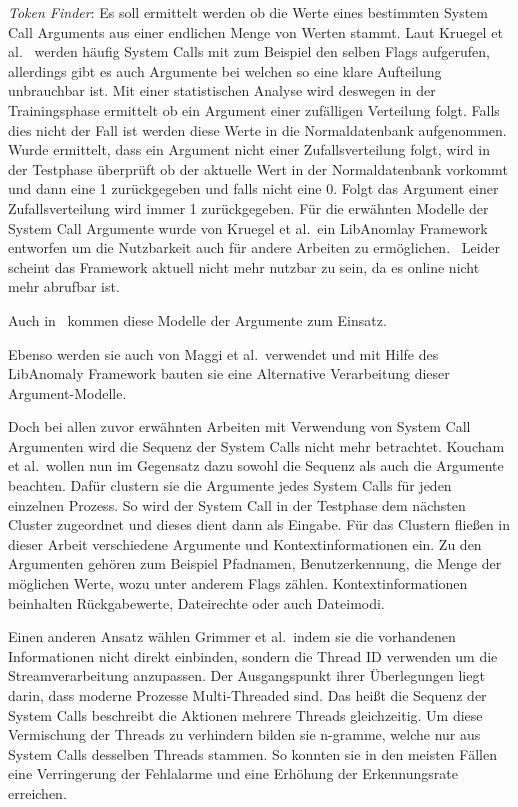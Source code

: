         \textit{Token Finder}: Es soll ermittelt werden ob die Werte eines bestimmten System Call Arguments aus einer endlichen Menge von Werten stammt.
        Laut Kruegel et al.~\cite{ARGUMENTS} werden häufig System Calls mit zum Beispiel den selben Flags aufgerufen, allerdings gibt es auch Argumente bei welchen so eine klare Aufteilung unbrauchbar ist.
        Mit einer statistischen Analyse wird deswegen in der Trainingsphase ermittelt ob ein Argument einer zufälligen Verteilung folgt.
        Falls dies nicht der Fall ist werden diese Werte in die Normaldatenbank aufgenommen.
        Wurde ermittelt, dass ein Argument nicht einer Zufallsverteilung folgt, wird in der Testphase überprüft ob der aktuelle Wert in der Normaldatenbank vorkommt und dann eine 1 zurückgegeben und falls nicht eine 0.
        Folgt das Argument einer Zufallsverteilung wird immer 1 zurückgegeben.
        Für die erwähnten Modelle der System Call Argumente wurde von Kruegel et al.\ ein LibAnomlay Framework entworfen um die Nutzbarkeit auch für andere Arbeiten zu ermöglichen.~\cite{ARGUMENTS}
        Leider scheint das Framework aktuell nicht mehr nutzbar zu sein, da es online nicht mehr abrufbar ist.

        Auch in~\cite{ARGUMENTS2} kommen diese Modelle der Argumente zum Einsatz.
        
        Ebenso werden sie auch von Maggi et al.\ verwendet und mit Hilfe des LibAnomaly Framework bauten sie eine Alternative Verarbeitung dieser Argument-Modelle.~\cite{MAGGI}

        Doch bei allen zuvor erwähnten Arbeiten mit Verwendung von System Call Argumenten wird die Sequenz der System Calls nicht mehr betrachtet.
        Koucham et al.\ wollen nun im Gegensatz dazu sowohl die Sequenz als auch die Argumente beachten.
        Dafür clustern sie die Argumente jedes System Calls für jeden einzelnen Prozess.
        So wird der System Call in der Testphase dem nächsten Cluster zugeordnet und dieses dient dann als Eingabe.
        Für das Clustern fließen in dieser Arbeit verschiedene Argumente und Kontextinformationen ein.
        Zu den Argumenten gehören zum Beispiel Pfadnamen, Benutzerkennung, die Menge der möglichen Werte, wozu unter anderem Flags zählen.
        Kontextinformationen beinhalten Rückgabewerte, Dateirechte oder auch Dateimodi.~\cite{ARGUMENTCLUSTERKOUCHAM2015}

        Einen anderen Ansatz wählen Grimmer et al.\ indem sie die vorhandenen Informationen nicht direkt einbinden, sondern die Thread ID verwenden um die Streamverarbeitung anzupassen.
        Der Ausgangspunkt ihrer Überlegungen liegt darin, dass moderne Prozesse Multi-Threaded sind.
        Das heißt die Sequenz der System Calls beschreibt die Aktionen mehrere Threads gleichzeitig.
        Um diese Vermischung der Threads zu verhindern bilden sie n-gramme, welche nur aus System Calls desselben Threads stammen.
        So konnten sie in den meisten Fällen eine Verringerung der Fehlalarme und eine Erhöhung der Erkennungsrate erreichen.\cite{IDSTHREADGRIMMER2021}

